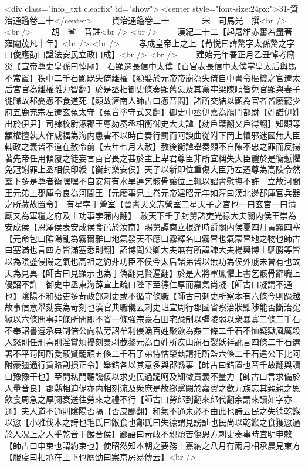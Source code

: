 <div class="info_txt clearfix" id="show">
<center style="font-size:24px;">31-資治通鑑卷三十</center>
  　　資治通鑑卷三十　　　　宋　司馬光　撰<br />
<br />
　　胡三省　音註<br />
<br />
　　漢紀二十二【起屠維赤奮若盡著雍閹茂凡十年】<br />
<br />
　　孝成皇帝上之上【荀悦曰諱驁字太孫驁之字曰俊應劭曰諡法安民立政曰成】<br />
<br />
　　建始元年春正月乙丑悼考廟災【宣帝尊史皇孫曰悼廟】　石顯遷長信中太僕【百官表長信中太僕掌皇太后輿馬不常置】秩中二千石顯既失倚離權【顯嬖於元帝帝崩為失倚自中書令樞機之官遷太后宮官為離權離力智翻】於是丞相御史條奏顯舊惡及其黨牢梁陳順皆免官顯與妻子徙歸故郡憂懣不食道死【顯故濟南人師古曰懣音悶】諸所交結以顯為官者皆廢罷少府五鹿充宗左遷玄菟太守【菟音塗守式又翻】御史中丞伊嘉為鴈門都尉【姓譜伊姓出於伊尹】司隸校尉涿郡王尊劾奏丞相衡御史大夫譚【劾戶槩翻又戶得翻】知顯等顓權擅執大作威福為海内患害不以時白奏行罰而阿諛曲從附下罔上懷邪迷國無大臣輔政之義皆不道在赦令前【去年七月大赦】赦後衡譚舉奏顯不自陳不忠之罪而反揚著先帝任用傾覆之徒妄言百官畏之甚於主上卑君尊臣非所宜稱失大臣體於是衡慙懼免冠謝罪上丞相侯印綬【衡封樂安侯】天子以新即位重傷大臣乃左遷尊為高陵令然羣下多是尊者衡嘿嘿不自安每有水旱連乞骸骨讓位上輒以詔書慰撫不許　立故河間王元弟上郡庫令良為河間王【元廢事見上卷元帝建昭元年如淳曰漢北邊郡庫官兵器之所藏故置令】　有星孛于營室【晉書天文志營室二星天子之宮也一曰玄宮一曰清廟又為軍糧之府及士功事孛蒲内翻】　赦天下壬子封舅諸吏光禄大夫關内侯王崇為安成侯【恩澤侯表安成侯食邑於汝南】賜舅譚商立根逢時爵關内侯夏四月黃霧四塞【元命包曰隂陽亂為霧爾雅曰地氣發天不應曰霧釋名曰霧冒也氣蒙冒地之物也師古曰塞滿也言四方皆滿塞悉則翻】詔博問公卿大夫無有所諱諫大夫楊興博士駟勝等皆以為隂盛侵陽之氣也高祖之約非功臣不侯今太后諸弟皆以無功為侯外戚未曾有也故天為見異【師古曰見顯示也為于偽翻見賢遍翻】於是大將軍鳳懼上書乞骸骨辭職上優詔不許　御史中丞東海薛宣上疏曰陛下至德仁厚而嘉氣尚凝【師古曰凝謂不通也】隂陽不和殆吏多苛政部刺史或不循守條職【師古曰刺史所察本有六條今則踰越故事信意舉劾妄為苛刻也漢官典職儀云刺史班宣周行郡國省察治狀黜陟能否斷治寃獄以六條問事非條所問即不省一條強宗豪右田宅踰制以彊陵弱以衆暴寡二條二千石不奉詔書遵承典制倍公向私旁詔牟利侵漁百姓聚歛為姦三條二千石不恤疑獄風厲殺人怒則任刑喜則淫賞煩擾刻暴剥截黎元為百姓所疾山崩石裂妖祥訛言四條二千石選署不平苟阿所愛蔽賢寵頑五條二千石子弟恃怙榮埶請托所監六條二千石違公下比阿附豪彊通行貨賂割損正令】舉錯各以其意多與郡縣事【師古曰錯置也音千故翻與讀曰豫豫干也】至開私門聽讒佞以求吏民過譴呵及細微責義不量力【師古曰言求備於人量音良】郡縣相迫促亦内相刻流及衆庶是故鄉黨闕於嘉賓之歡九族忘其親親之恩飲食周急之厚彌衰送往勞來之禮不行【師古曰勞郎到翻來郎代翻余謂來讀如字亦通】夫人道不通則隂陽否隔【否皮鄙翻】和氣不通未必不由此也詩云民之失德乾餱以愆【小雅伐木之詩也毛氏曰餱食也鄭氏曰失德謂見謗訕也民尚以乾餱之食獲愆過於人况上之人乎乾音干餱音侯】鄙語曰苛政不親煩苦傷恩方刺史奏事時宜明申敕【師古曰申束也謂約束也】使昭然知本朝之要務上嘉納之八月有兩月相承晨見東方【服䖍曰相承在上下也應劭曰案京房易傳云】<br />
